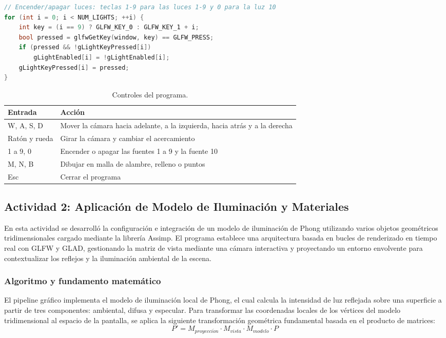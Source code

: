 \begin{lstlisting}[language=C++, firstnumber=369, caption={Encendido y apagado de las fuentes en processInput() (08\_IllumModels2.cpp).}, label={lst:teclas}]
// Encender/apagar luces: teclas 1-9 para las luces 1-9 y 0 para la luz 10
for (int i = 0; i < NUM_LIGHTS; ++i) {
	int key = (i == 9) ? GLFW_KEY_0 : GLFW_KEY_1 + i;
	bool pressed = glfwGetKey(window, key) == GLFW_PRESS;
	if (pressed && !gLightKeyPressed[i])
		gLightEnabled[i] = !gLightEnabled[i];
	gLightKeyPressed[i] = pressed;
}
\end{lstlisting}

\begin{table}[H]
\centering
\renewcommand{\arraystretch}{1.2}
\begin{tabular}{|p{3.2cm}|p{11.5cm}|}
\hline
\textbf{Entrada} & \textbf{Acción} \\ \hline
W, A, S, D & Mover la cámara hacia adelante, a la izquierda, hacia atrás y a la derecha \\ \hline
Ratón y rueda & Girar la cámara y cambiar el acercamiento \\ \hline
1 a 9, 0 & Encender o apagar las fuentes 1 a 9 y la fuente 10 \\ \hline
M, N, B & Dibujar en malla de alambre, relleno o puntos \\ \hline
Esc & Cerrar el programa \\ \hline
\end{tabular}
\caption{Controles del programa.}
\label{tab:controles}
\end{table}

\subsection{Actividad 2: Aplicación de Modelo de Iluminación y Materiales}
En esta actividad se desarrolló la configuración e integración de un modelo de iluminación de Phong utilizando varios objetos geométricos tridimensionales cargado mediante la librería Assimp. El programa establece una arquitectura basada en bucles de renderizado en tiempo real con GLFW y GLAD, gestionando la matriz de vista mediante una cámara interactiva y proyectando un entorno envolvente para contextualizar los reflejos y la iluminación ambiental de la escena.

\subsubsection{Algoritmo y fundamento matemático}
El pipeline gráfico implementa el modelo de iluminación local de Phong, el cual calcula la intensidad de luz reflejada sobre una superficie a partir de tres componentes: ambiental, difusa y especular. Para transformar las coordenadas locales de los vértices del modelo tridimensional al espacio de la pantalla, se aplica la siguiente transformación geométrica fundamental basada en el producto de matrices:
\begin{equation}
    P' = M_{proyecci\acute{o}n} \cdot M_{vista} \cdot M_{modelo} \cdot P
    \label{eq:transformacion}
\end{equation}

